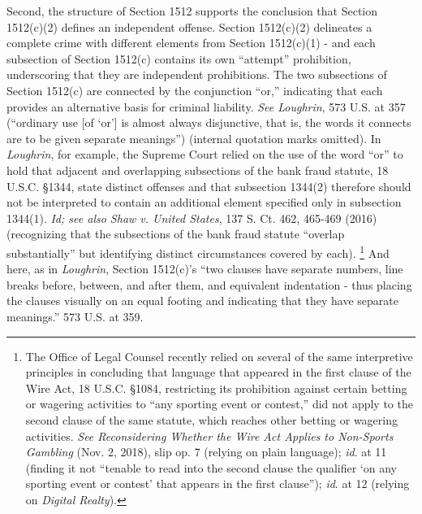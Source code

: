 Second, the structure of Section 1512 supports the conclusion that Section 1512(c)(2) defines an independent offense.
Section 1512(c)(2) delineates a complete crime with different elements from Section 1512(c)(1) - and each subsection of Section 1512(c) contains its own “attempt” prohibition, underscoring that they are independent prohibitions.
The two subsections of Section 1512(c) are connected by the conjunction “or,” indicating that each provides an alternative basis for criminal liability.
\textit{See Loughrin}, 573 U.S. at 357 (“ordinary use [of ‘or’] is almost always disjunctive, that is, the words it connects are to be given separate meanings”) (internal quotation marks omitted).
In \textit{Loughrin}, for example, the Supreme Court relied on the use of the word “or” to hold that adjacent and overlapping subsections of the bank fraud statute, 18 U.S.C. \S 1344, state distinct offenses and that subsection 1344(2) therefore should not be interpreted to contain an additional element specified only in subsection 1344(1).
\textit{Id; see also Shaw v. United States}, 137 S. Ct. 462, 465-469 (2016) (recognizing that the subsections of the bank fraud statute “overlap substantially” but identifying distinct circumstances covered by each).%
\footnote{The Office of Legal Counsel recently relied on several of the same interpretive principles in concluding that language that appeared in the first clause of the Wire Act, 18 U.S.C. \S 1084, restricting its prohibition against certain betting or wagering activities to “any sporting event or contest,” did not apply to the second clause of the same statute, which reaches other betting or wagering activities.
\textit{See Reconsidering Whether the Wire Act Applies to Non-Sports Gambling} (Nov. 2, 2018), slip op. 7 (relying on plain language);
\textit{id}. at 11 (finding it not “tenable to read into the second clause the qualifier ‘on any sporting event or contest’ that appears in the first clause”);
\textit{id}. at 12 (relying on \textit{Digital Realty}).}
And here, as in \textit{Loughrin}, Section 1512(c)’s “two clauses have separate numbers, line breaks before, between, and after them, and equivalent indentation - thus placing the clauses visually on an equal footing and indicating that they have separate meanings.” 573 U.S. at 359.

